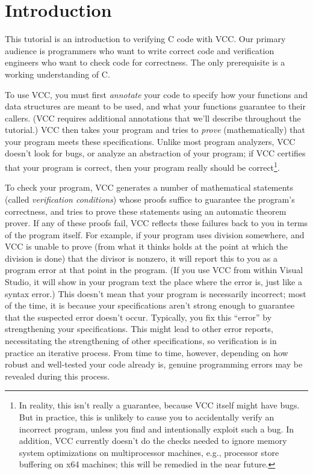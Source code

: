 \section{Introduction}
This tutorial is an introduction to verifying C code with VCC. Our
primary audience is programmers who want to write correct code and
verification engineers who want to check code for correctness. The
only prerequisite is a working understanding of C. 

To use VCC, you must first \emph{annotate} your code to specify how
your functions and data structures are meant to be used, and what your
functions guarantee to their callers. (VCC requires additional
annotations that we'll describe throughout the tutorial.) VCC then
takes your program and tries to \emph{prove} (mathematically) that
your program meets these specifications.  Unlike most program
analyzers, VCC doesn't look for bugs, or analyze an abstraction of
your program; if VCC certifies that your program is correct, then your
program really should be correct\footnote{In reality, this isn't
  really a guarantee, because VCC itself might have bugs. But in
  practice, this is unlikely to cause you to accidentally verify an
  incorrect program, unless you find and intentionally exploit such a
  bug. In addition, VCC currently doesn't do the checks needed to
  ignore memory system optimizations on multiprocessor machines, e.g.,
  processor store buffering on x64 machines; this will be remedied in the near
  future.}. 

To check your program, VCC generates a number of mathematical
statements (called \emph{verification conditions}) whose proofs
suffice to guarantee the program's correctness, and tries to prove
these statements using an automatic theorem prover. If any of these
proofs fail, VCC reflects these failures back to you in terms of the
program itself. For example, if your program uses division
somewhere, and VCC is unable to prove (from what it thinks holds at the
point at which the division is done) that the divisor is nonzero, it
will report this to you as a program error at that point in the
program. (If you use VCC from within Visual Studio, it will show in
your program text the place where the error is, just like a syntax
error.) This doesn't mean that your program is necessarily incorrect;
most of the time, it is because your specifications aren't strong
enough to guarantee that the suspected error doesn't occur.
Typically, you fix this ``error'' by strengthening your
specifications. This might lead to other error reports, necessitating
the strengthening of other specifications, so verification is in
practice an iterative process.  From time to time, however, depending on how
robust and well-tested your code already is, genuine programming errors may be
revealed during this process.

